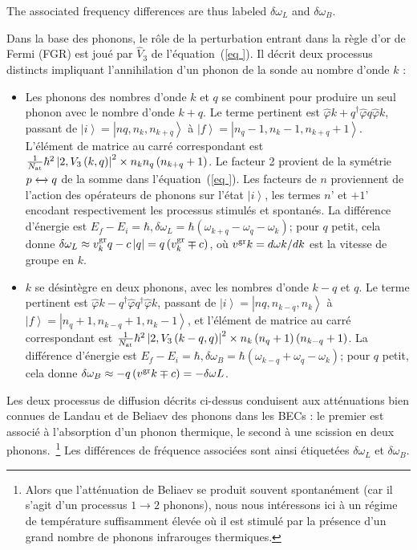 \documentclass[aps,prd,notitlepage,amsfonts,amssymb,amsmath,nofootinbib,superscriptaddress,longbibliography]{revtex4-2}
\newcommand{\trad}[1]{\textcolor{tradcolor}{#1}}
\begin{document}
The associated frequency differences are thus labeled $\delta\omega_{L}$ and $\delta\omega_{B}$.
\trad{
Dans la base des phonons, le rôle de la perturbation entrant dans la règle d'or de Fermi (FGR) est joué par $\hat{V}_{3}$ de l'équation~(\ref{eq
}). Il décrit deux processus distincts impliquant l'annihilation d'un phonon de la sonde au nombre d'onde $k$ :
\begin{itemize}
\item Les phonons des nombres d'onde $k$ et $q$ se combinent pour produire un seul phonon avec le nombre d'onde $k+q$. Le terme pertinent est $\hat{\varphi}{k+q}^{\dagger}\hat{\varphi}{q}\hat{\varphi}{k}$, passant de $\left|i\right\rangle = \left|n{q}, n_{k}, n_{k+q}\right\rangle$ à $\left|f\right\rangle = \left|n_{q}-1,n_{k}-1,n_{k+q}+1\right\rangle$. L'élément de matrice au carré correspondant est $\frac{1}{N_{\rm at}} \hbar^{2} \left|2, V_3\left(k,q\right)\right|^{2} \times n_{k} n_{q} \left(n_{k+q}+1\right)$. Le facteur 2 provient de la symétrie $p \xleftrightarrow[]{} q$ de la somme dans l'équation~(\ref{eq
}). Les facteurs de $n$ proviennent de l'action des opérateurs de phonons sur l'état $\left|i\right\rangle$, les termes $n$' et $+1$' encodant respectivement les processus stimulés et spontanés. La différence d'énergie est $E_{f}-E_{i} = \hbar , \delta\omega_{L} = \hbar \left( \omega_{k+q}-\omega_{q}-\omega_{k} \right)$; pour $q$ petit, cela donne $\delta \omega_{L} \approx v^{\rm gr}_k q - c \left|q\right| = q \left(v^{\rm gr}_k \mp c\right)$, où $v^{\rm gr}k = d\omega{k}/dk$ est la vitesse de groupe en $k$.
\item $k$ se désintègre en deux phonons, avec les nombres d'onde $k-q$ et $q$. Le terme pertinent est $\hat{\varphi}{k-q}^{\dagger}\hat{\varphi}{q}^{\dagger}\hat{\varphi}{k}$, passant de $\left|i\right\rangle = \left|n{q}, n_{k-q}, n_{k}\right\rangle$ à $\left|f\right\rangle = \left|n_{q}+1,n_{k-q}+1,n_{k}-1\right\rangle$, et l'élément de matrice au carré correspondant est $\frac{1}{N_{\rm at}} \hbar^{2} \left|2 , V_3\left(k-q,q\right)\right|^{2} \times n_{k} \left(n_{q}+1\right) \left(n_{k-q}+1\right)$. La différence d'énergie est $E_{f}-E_{i} = \hbar , \delta\omega_{B} = \hbar \left( \omega_{k-q}+\omega_{q}-\omega_{k} \right)$; pour $q$ petit, cela donne $\delta \omega_{B} \approx -q \left(v^{\rm gr}k \mp c\right) = -\delta \omega{L}$.
\end{itemize}
Les deux processus de diffusion décrits ci-dessus conduisent aux atténuations bien connues de Landau et de Beliaev des phonons dans les BECs : le premier est associé à l'absorption d'un phonon thermique, le second à une scission en deux phonons.~\footnote{Alors que l'atténuation de Beliaev se produit souvent spontanément (car il s'agit d'un processus $1 \to 2$ phonons), nous nous intéressons ici à un régime de température suffisamment élevée où il est stimulé par la présence d'un grand nombre de phonons infrarouges thermiques.}
Les différences de fréquence associées sont ainsi étiquetées $\delta\omega_{L}$ et $\delta\omega_{B}$.
}
\end{document}
